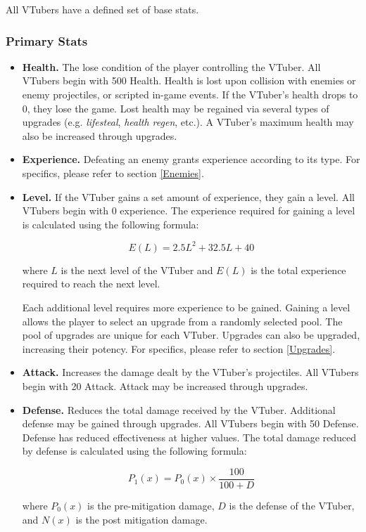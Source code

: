 \documentclass[10pt, a4paper]{article}
\begin{document}
  	All VTubers have a defined set of base stats.
  	
  	\subsubsection{Primary Stats}

  	\begin{itemize}
  	\item \textbf{Health.} The lose condition of the player controlling the VTuber. All VTubers begin with 500 Health. Health is lost upon collision with enemies or enemy projectiles, or scripted in-game events. If the VTuber's health drops to 0, they lose the game. Lost health may be regained via several types of upgrades (e.g. \textit{lifesteal}, \textit{health regen}, etc.). A VTuber's maximum health may also be increased through upgrades.

  	\item \textbf{Experience.} Defeating an enemy grants experience according to its type. For specifics, please refer to section \ref{Enemies}. 
  	
  	\item \textbf{Level.} If the VTuber gains a set amount of experience, they gain a level. All VTubers begin with 0 experience. The experience required for gaining a level is calculated using the following formula:
  	
  	\[E(L) = 2.5L^2 + 32.5L + 40\]
  	
  	where $L$ is the next level of the VTuber and $E(L)$ is the total experience required to reach the next level.
  	
  	Each additional level requires more experience to be gained. Gaining a level allows the player to select an upgrade from a randomly selected pool. The pool of upgrades are unique for each VTuber. Upgrades can also be upgraded, increasing their potency. For specifics, please refer to section \ref{Upgrades}.
  	
  	\item \textbf{Attack.} Increases the damage dealt by the VTuber's projectiles. All VTubers begin with 20 Attack. Attack may be increased through upgrades.

  	\item\textbf{Defense.} Reduces the total damage received by the VTuber. Additional defense may be gained through upgrades. All VTubers begin with 50 Defense. Defense has reduced effectiveness at higher values. The total damage reduced by defense is calculated using the following formula:
  	
  	\[P_1(x) = P_0(x) \times \frac{100}{100+D}\]
  	
  	where $P_0(x)$ is the pre-mitigation damage, $D$ is the defense of the VTuber, and $N(x)$ is the post mitigation damage.
  	
  	\end{itemize}
  	
\end{document}
